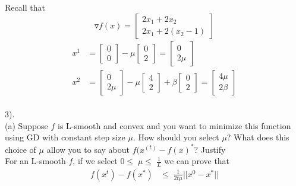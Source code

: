 \documentclass[12pt,letterpaper]{article}
\begin{document}
Recall that 
\[\triangledown f(x) = 
\begin{bmatrix}
2x_1 + 2x_2
\\
2x_1 + 2(x_2 - 1)
\end{bmatrix}\]
\begin{equation*}
    \begin{split}
        x^1 &= \begin{bmatrix}
        0
        \\
        0
        \end{bmatrix}
        -\mu \begin{bmatrix}
        0
        \\
        2
        \end{bmatrix} = \begin{bmatrix}
        0
        \\
        2\mu
        \end{bmatrix}
        \\
        x^2 &= \begin{bmatrix}
        0
        \\
        2\mu
        \end{bmatrix}
        - \mu \begin{bmatrix}
        4
        \\
        2
        \end{bmatrix}
        +
        \beta \begin{bmatrix}
        0
        \\
        2
        \end{bmatrix}
        =
        \begin{bmatrix}
        4\mu
        \\
        2\beta
        \end{bmatrix}
    \end{split}
\end{equation*}
\vspace{10pt}
\\
3).
\vspace{10pt}
\\
(a) Suppose $f$ is L-smooth and convex and you want to minimize this function using GD with constant step size $\mu$. How should you select $\mu$? What does this choice of $\mu$ allow you to say about $f(x^{(t)} - f(x)^*$? Justify
\vspace{10pt}\\
For an L-smooth $f$, if we select $ 0\le\; \mu \le\; \frac{1}{L}$ we can prove that 
\begin{equation*}
    \begin{split}
        f(x^t)-f(x^*) &\le\; \frac{1}{2t\mu}||x^0 - x^*||
    \end{split}
\end{equation*}
\end{document}
